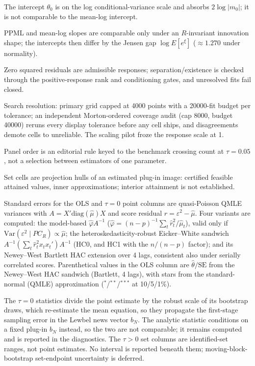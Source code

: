 \documentclass[11pt]{article}
\begin{document}
\begin{table}[!htbp]
\begin{threeparttable}
\begin{tablenotes}[flushleft]
\item The intercept $\theta_0$ is on the log conditional-variance scale and absorbs $2\log|m_0|$; it is not comparable to the mean-log intercept.
\item PPML and mean-log slopes are comparable only under an $R$-invariant innovation shape; the intercepts then differ by the Jensen gap $\log E[e^{\xi}]$ ($\approx 1.270$ under normality).
\item Zero squared residuals are admissible responses; separation/existence is checked through the positive-response rank and conditioning gates, and unresolved fits fail closed.
\item Search resolution: primary grid capped at 4000 points with a 20000-fit budget per tolerance; an independent Morton-ordered coverage audit (cap 8000, budget 40000) reruns every display tolerance before any cell ships, and disagreements demote cells to unreliable. The scaling pilot froze the response scale at 1.
\item Panel order is an editorial rule keyed to the benchmark crossing count at $\tau{=}0.05$, not a selection between estimators of one parameter.
\item Set cells are projection hulls of an estimated plug-in image: certified feasible attained values, inner approximations; interior attainment is not established.
\item Standard errors for the OLS and $\tau{=}0$ point columns are quasi-Poisson QMLE variances with $A = X'\mathrm{diag}(\hat\mu)X$ and score residual $\hat r = \varepsilon^2 - \hat\mu$. Four variants are computed: the model-based $\hat\varphi A^{-1}$ ($\hat\varphi = (n{-}p)^{-1}\sum_t \hat r_t^2/\hat\mu_t$), valid only if $\mathrm{Var}(\varepsilon^2 \mid PC_R) \propto \hat\mu$; the heteroskedasticity-robust Eicker--White sandwich $A^{-1}(\sum_t \hat r_t^2 x_t x_t')A^{-1}$ (HC0, and HC1 with the $n/(n{-}p)$ factor); and its Newey--West Bartlett HAC extension over 4 lags, consistent also under serially correlated scores. Parenthetical values in the OLS column are $\hat\theta/\mathrm{SE}$ from the Newey--West HAC sandwich (Bartlett, 4 lags), with stars from the standard-normal (QMLE) approximation ($^{*}$/$^{**}$/$^{***}$ at 10/5/1\%).
\item The $\tau{=}0$ statistics divide the point estimate by the robust scale of its bootstrap draws, which re-estimate the mean equation, so they propagate the first-stage sampling error in the Lewbel news vector $b_N$. The analytic statistic conditions on a fixed plug-in $b_N$ instead, so the two are not comparable; it remains computed and is reported in the diagnostics. The $\tau{>}0$ set columns are identified-set ranges, not point estimates. No interval is reported beneath them; moving-block-bootstrap set-endpoint uncertainty is deferred.
\end{tablenotes}
\end{threeparttable}
\end{table}
\end{document}
